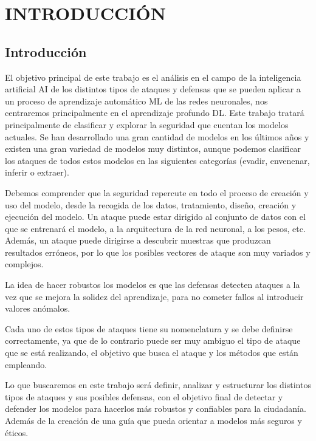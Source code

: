 \chapter{INTRODUCCIÓN}
\label{ch:1}

\section{Introducción}

El objetivo principal de este trabajo es el análisis en el campo de la inteligencia artificial \gls{AI} de los distintos tipos de ataques y defensas que se pueden aplicar a un proceso de aprendizaje automático \gls{ML} de las redes neuronales, nos centraremos principalmente en el aprendizaje profundo \gls{DL}.
Este trabajo tratará principalmente de clasificar y explorar la seguridad que cuentan los modelos actuales.
Se han desarrollado una gran cantidad de modelos en los últimos años y existen una gran variedad de modelos muy distintos, aunque podemos clasificar los ataques de todos estos modelos en las siguientes categorías (evadir, envenenar, inferir o extraer).

Debemos comprender que la seguridad repercute en todo el proceso de creación y uso del modelo, desde la recogida de los datos, tratamiento, diseño, creación y ejecución del modelo.
Un ataque puede estar dirigido al conjunto de datos con el que se entrenará el modelo, a la arquitectura de la red neuronal, a los pesos, etc.
Además, un ataque puede dirigirse a descubrir muestras que produzcan resultados erróneos, por lo que los posibles vectores de ataque son muy variados y complejos.

La idea de hacer robustos los modelos es que las defensas detecten ataques a la vez que se mejora la solidez del aprendizaje, para no cometer fallos al introducir valores anómalos.

Cada uno de estos tipos de ataques tiene su nomenclatura y se debe definirse correctamente, ya que de lo contrario puede ser muy ambiguo el tipo de ataque que se está realizando, el objetivo que busca el ataque y los métodos que están empleando.

Lo que buscaremos en este trabajo será definir, analizar y estructurar los distintos tipos de ataques y sus posibles defensas, con el objetivo final de detectar y defender los modelos para hacerlos más robustos y confiables para la ciudadanía.
Además de la creación de una guía que pueda orientar a modelos más seguros y éticos.


